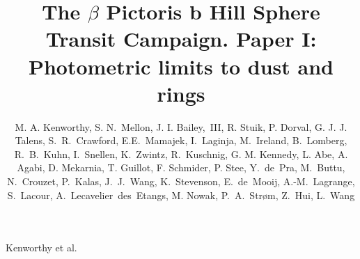 \documentclass{article}
\begin{document}
%
%
\title{The $\beta$ Pictoris b Hill Sphere Transit Campaign. Paper I: Photometric limits to dust and rings}{Kenworthy et al.}
% 
%
%
\author{M. A. Kenworthy, S. N.~Mellon, J. I. Bailey,~III, R. Stuik, P. Dorval,
G. J. J. Talens, S.~R.~Crawford, E.E.~Mamajek,
I.~Laginja, M.~Ireland,
B.~Lomberg, R.~B.~Kuhn,
I.~Snellen, K.~Zwintz,
R.~Kuschnig, G. M. Kennedy,
L. Abe, A. Agabi,
D. Mekarnia,
T. Guillot,
F. Schmider,
P. Stee,
Y.~de~Pra,
M.~Buttu,
N.~Crouzet,
P.~Kalas,
J.~J.~Wang,
K.~Stevenson,
E.~de~Mooij,
A.-M.~Lagrange,
S.~Lacour,
A.~Lecavelier~des~Etangs,
M. Nowak,
P.~A.~Str\o{}m,
Z.~Hui,
L.~Wang
}
\end{document}
